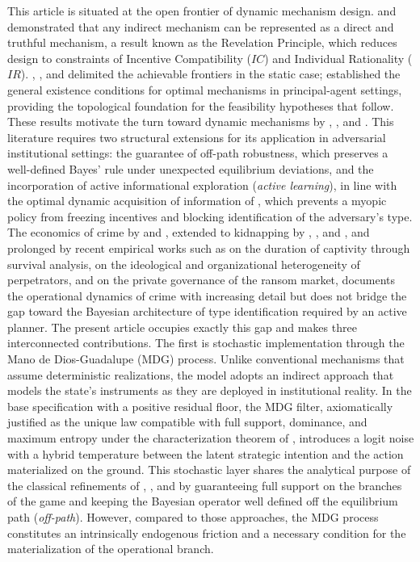 \documentclass[review,authoryear,12pt]{elsarticle}
\theoremstyle{plain}
\theoremstyle{definition}
\newcommand{\1}{\mathbf{1}}
\begin{document}
This article is situated at the open frontier of dynamic mechanism design. \citet{Gibbard1973} and \citet{Myerson1979IC,Myerson1981} demonstrated that any indirect mechanism can be represented as a direct and truthful mechanism, a result known as the Revelation Principle, which reduces design to constraints of Incentive Compatibility ($IC$) and Individual Rationality ($IR$). \citet{MyersonSatterthwaite1983}, \citet{Rochet1987}, and \citet{RochetChone1998} delimited the achievable frontiers in the static case; \citet{KadanRenySwinkels2017} established the general existence conditions for optimal mechanisms in principal-agent settings, providing the topological foundation for the feasibility hypotheses that follow. These results motivate the turn toward dynamic mechanisms by \citet{CourtyLi2000}, \citet{EsoSzentes2007}, and \citet{PavanSegalToikka2014}. This literature requires two structural extensions for its application in adversarial institutional settings: the guarantee of off-path robustness, which preserves a well-defined Bayes' rule under unexpected equilibrium deviations, and the incorporation of active informational exploration (\textit{active learning}), in line with the optimal dynamic acquisition of information of \citet{Zhong2022}, which prevents a myopic policy from freezing incentives and blocking identification of the adversary's type. The economics of crime by \citet{Becker1968} and \citet{Ehrlich1973}, extended to kidnapping by \citet{Selten1977Kidnapping}, \citet{Iqbal2017Kidnapping}, and \citet{Mejia2000Secuestro}, and prolonged by recent empirical works such as \citet{Detotto2014Ransom} on the duration of captivity through survival analysis, \citet{Forest2012Kidnapping} on the ideological and organizational heterogeneity of perpetrators, and \citet{Shortland2019Kidnap} on the private governance of the ransom market, documents the operational dynamics of crime with increasing detail but does not bridge the gap toward the Bayesian architecture of type identification required by an active planner. The present article occupies exactly this gap and makes three interconnected contributions. The first is stochastic implementation through the Mano de Dios-Guadalupe (MDG) process. Unlike conventional mechanisms that assume deterministic realizations, the model adopts an indirect approach that models the state's instruments as they are deployed in institutional reality. In the base specification with a positive residual floor, the MDG filter, axiomatically justified as the unique law compatible with full support, dominance, and maximum entropy under the characterization theorem of \citet{Jaynes1957Information}, introduces a logit noise with a hybrid temperature between the latent strategic intention and the action materialized on the ground. This stochastic layer shares the analytical purpose of the classical refinements of \citet{Selten1975Perfectness}, \citet{KrepsWilson1982}, and \citet{FudenbergTirole1991} by guaranteeing full support on the branches of the game and keeping the Bayesian operator well defined off the equilibrium path (\textit{off-path}). However, compared to those approaches, the MDG process constitutes an intrinsically endogenous friction and a necessary condition for the materialization of the operational branch.
\end{document}
